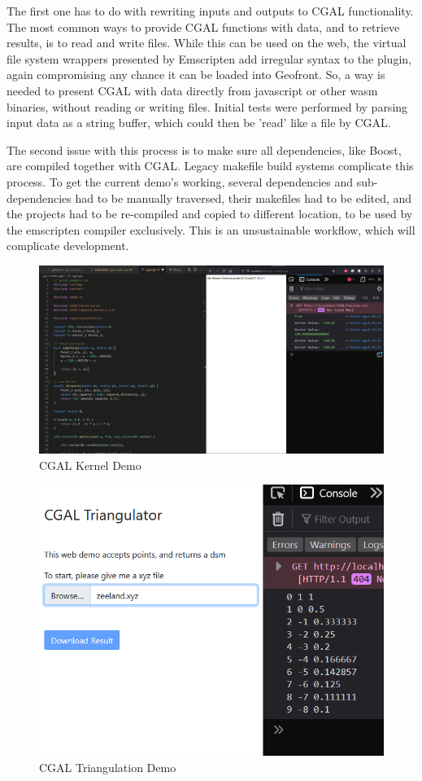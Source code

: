 The first one has to do with rewriting inputs and outputs to CGAL functionality.
The most common ways to provide CGAL functions with data, and to retrieve results, is to read and write files. 
While this can be used on the web, the virtual file system wrappers presented by Emscripten add irregular syntax to the plugin, again compromising any chance it can be loaded into Geofront.
So, a way is needed to present CGAL with data directly from javascript or other wasm binaries, without reading or writing files. 
Initial tests were performed by parsing input data as a string buffer, which could then be 'read' like a file by CGAL.

The second issue with this process is to make sure all dependencies, like Boost, are compiled together with CGAL.
Legacy makefile build systems complicate this process. 
To get the current demo's working, several dependencies and sub-dependencies had to be manually traversed, their makefiles had to be edited, and the projects had to be re-compiled and copied to different location, to be used by the emscripten compiler exclusively. 
This is an unsustainable workflow, which will complicate development.  


\begin{figure}
  \graphicspath{{../../assets/images/6.1.4/}}
  \centering
  \includegraphics[width=\linewidth]{demo-2.PNG}
  \caption[loading a plugin]{CGAL Kernel Demo}
  \label{fig:cgal-tryout-2}
\end{figure}

\begin{figure}
  \graphicspath{{../../assets/images/6.1.4/}}
  \centering
  \includegraphics[width=0.50\linewidth]{demo-3.PNG}
  \caption[loading a plugin]{CGAL Triangulation Demo}
  \label{fig:cgal-tryout-3}
\end{figure}

